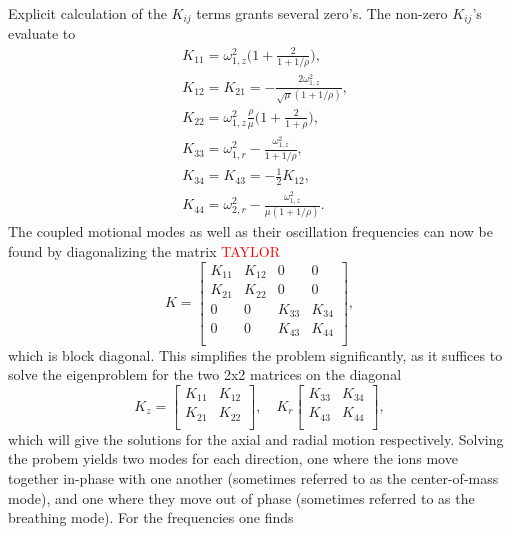 Explicit calculation of the $K_{ij}$ terms grants several zero's. The non-zero $K_{ij}$'s evaluate to
\begin{align}
    &K_{11} = \omega_{1,z}^2\bigg(1+\frac{2}{1+1/\rho}\bigg),\\
    &K_{12} = K_ {21} = -\frac{2\omega_{1,z}^2}{\sqrt{\mu}(1+1/\rho)},\\
    &K_{22} = \omega_{1,z}^2\frac{\rho}{\mu}\bigg(1+\frac{2}{1+\rho}\bigg),\\
    &K_{33} = \omega_{1,r}^2 - \frac{\omega_{1,z}^2}{1+1/\rho},\\
    &K_{34} = K_{43} = -\frac{1}{2}K_{12},\\
    &K_{44} = \omega_{2,r}^2-\frac{\omega_{1,z}^2}{\mu(1+1/\rho)}.
\end{align}
The coupled motional modes as well as their oscillation frequencies can now be found by diagonalizing the matrix \textcolor{red}{TAYLOR}
\begin{equation}
    K = \begin{bmatrix}
        K_{11} & K_{12} & 0 & 0\\
        K_{21} & K_{22} & 0 & 0\\
        0 & 0 & K_{33} & K_{34}\\
        0 & 0 & K_{43} & K_{44}\\
    \end{bmatrix},
\end{equation}
which is block diagonal. This simplifies the problem significantly, as it suffices to solve the eigenproblem for the two 2x2 matrices on the diagonal
\begin{equation}
    K_{z} = \begin{bmatrix}
        K_{11} & K_{12}\\
        K_{21} & K_{22}\\
    \end{bmatrix},
    \quad
    K_{r}
    \begin{bmatrix}
        K_{33} & K_{34}\\
        K_{43} & K_{44}\\
    \end{bmatrix},
\end{equation}
which will give the solutions for the axial and radial motion respectively.
Solving the probem yields two modes for each direction, one where the ions move together in-phase with one another (sometimes referred to as the center-of-mass mode), and one where they move out of phase (sometimes referred to as the breathing mode).
For the frequencies one finds
